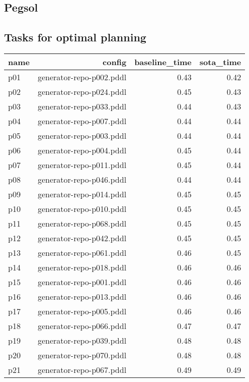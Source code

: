 \documentclass{article}
\begin{document}
                \newpage \subsection{Pegsol}
                    \subsection*{Tasks for optimal planning}
                    
                            \begin{center}
                            \scriptsize
                            \begin{tabular}{@{}l|r|r|r@{}}
                            name & config & baseline\_time & sota\_time\\\midrule
                              p01& generator-repo-p002.pddl&0.43&0.42\\
  p02& generator-repo-p024.pddl&0.45&0.43\\
  p03& generator-repo-p033.pddl&0.44&0.43\\
  p04& generator-repo-p007.pddl&0.44&0.44\\
  p05& generator-repo-p003.pddl&0.44&0.44\\
  p06& generator-repo-p004.pddl&0.45&0.44\\
  p07& generator-repo-p011.pddl&0.45&0.44\\
  p08& generator-repo-p046.pddl&0.44&0.44\\
  p09& generator-repo-p014.pddl&0.45&0.45\\
  p10& generator-repo-p010.pddl&0.45&0.45\\
  p11& generator-repo-p068.pddl&0.45&0.45\\
  p12& generator-repo-p042.pddl&0.45&0.45\\
  p13& generator-repo-p061.pddl&0.46&0.45\\
  p14& generator-repo-p018.pddl&0.46&0.46\\
  p15& generator-repo-p001.pddl&0.46&0.46\\
  p16& generator-repo-p013.pddl&0.46&0.46\\
  p17& generator-repo-p005.pddl&0.46&0.46\\
  p18& generator-repo-p066.pddl&0.47&0.47\\
  p19& generator-repo-p039.pddl&0.48&0.48\\
  p20& generator-repo-p070.pddl&0.48&0.48\\
  p21& generator-repo-p067.pddl&0.49&0.49\\

\end{tabular}
\end{center}
\end{document}
